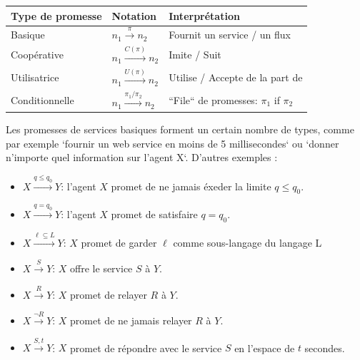 \begin{table}[H]
    \begin{tabularx}{\linewidth}{
        >{\raggedright\arraybackslash}X
        >{\raggedright\arraybackslash}X
        >{\raggedright\arraybackslash}X
    }
        \hline
        \textbf{Type de promesse} & 
        \textbf{Notation} & 
        \textbf{Interprétation} \\
        \hline

        Basique &
        $n_1 \xrightarrow{\pi} n_2$ &
        Fournit un service / un flux \\

        Coopérative &
        $n_1 \xrightarrow{C(\pi)} n_2$ &
        Imite / Suit \\

        Utilisatrice &
        $n_1 \xrightarrow{U(\pi)} n_2$ &
        Utilise / Accepte de la part de\\

        Conditionnelle &
        $n_1 \xrightarrow{\pi_1/\pi_2} n_2$ &
        ``File`` de promesses: $\pi_1$ if $\pi_2$\\
    \end{tabularx}
\end{table}
   
Les promesses de services basiques forment un certain nombre de types, comme par
exemple `fournir un web service en moins de 5 millisecondes` ou `donner
n'importe quel information sur l'agent X`. D'autres exemples :

\begin{itemize}
    \item $X \xrightarrow{q \leq q_0} Y $: l'agent $X$ promet de ne jamais éxeder la
        limite $q \leq q_0$.
    \item $X \xrightarrow{q = q_0} Y $: l'agent $X$ promet de satisfaire
        $q = q_0$.
    \item $X \xrightarrow{\ell \subseteq  L} Y $: $X$ promet de garder $\ell$
        comme sous-langage du langage L
    \item $X \xrightarrow{S} Y $: $X$ offre le service $S$ à $Y$.
    \item $X \xrightarrow{R} Y $: $X$ promet de relayer $R$ à $Y$.
    \item $X \xrightarrow{\neg R} Y $: $X$ promet de ne jamais relayer $R$ à $Y$.
    \item $X \xrightarrow{S,t} Y $: $X$ promet de répondre avec le service $S$
        en l'espace de $t$ secondes.
\end{itemize}

